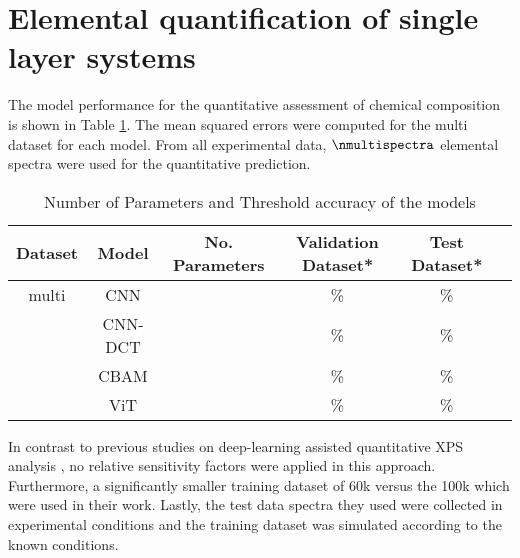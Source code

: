 \section{Elemental quantification of single layer systems}

The model performance for the quantitative assessment of chemical composition is shown in Table \ref{tab:acc_quant}. The mean squared errors were computed for the multi dataset for each model.
From all experimental data, $\nmultispectra$ elemental spectra were used for the quantitative prediction. 

\begin{table}[H]
    \centering
    \begin{tabular}{c|c|c|c|c|c}
       Dataset & Model   & No. Parameters & Validation Dataset*  & Test Dataset*    \\
        \hline
        multi  & CNN     &                &        \%              &         \% \\
               & CNN-DCT &                &       \%              &          \% \\
               & CBAM    &                &       \%              &          \% \\
               & ViT     &                &       \%              &          \% \\
    \end{tabular}
    \caption{Number of Parameters and Threshold accuracy of the models}
    \label{tab:acc_quant}
\end{table}


In contrast to previous studies on deep-learning assisted quantitative XPS analysis \cite{drera_deep_2019}, no relative sensitivity factors were applied in this approach. Furthermore, a significantly smaller training dataset of 60k versus the 100k which were used in their work. Lastly, the test data spectra they used were collected in experimental conditions and the training dataset was simulated according to the known conditions.

